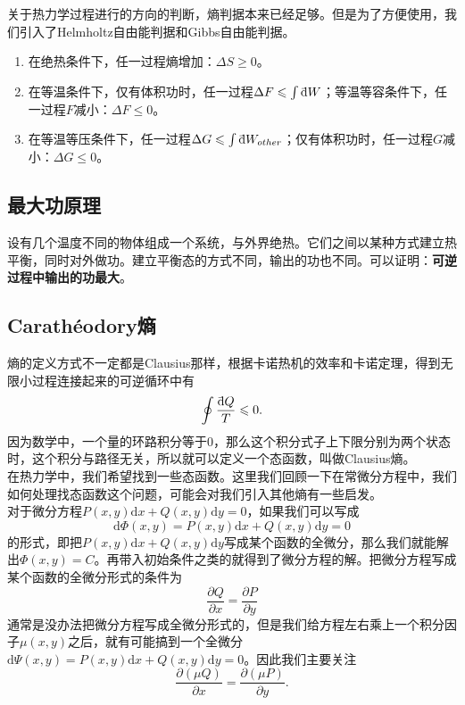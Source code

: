 \documentclass[UTF8]{ctexart}
\newcommand{\dbar}{\mathrm{\mathchar'26\mkern-9mu d}}
\newcommand{\md}{\mathrm{d}}
\numberwithin{equation}{subsection}
\begin{document}
关于热力学过程进行的方向的判断，熵判据本来已经足够。但是为了方便使用，我们引入了Helmholtz自由能判据和Gibbs自由能判据。
\begin{enumerate}
\item 在绝热条件下，任一过程熵增加：$\Delta S\geqslant0$。
\item 在等温条件下，仅有体积功时，任一过程$\Delta F\leqslant \int \dbar W$；等温等容条件下，任一过程$F$减小：$\Delta F\leqslant0$。
\item 在等温等压条件下，任一过程$\Delta G\leqslant \int \dbar W_{other}$；仅有体积功时，任一过程$G$减小：$\Delta G\leqslant0$。
\end{enumerate}
\subsection{最大功原理}
设有几个温度不同的物体组成一个系统，与外界绝热。它们之间以某种方式建立热平衡，同时对外做功。建立平衡态的方式不同，输出的功也不同。可以证明：\textbf{可逆过程中输出的功最大}。

\subsection{Carath\'{e}odory熵}

熵的定义方式不一定都是Clausius那样，根据卡诺热机的效率和卡诺定理，得到无限小过程连接起来的可逆循环中有
\begin{equation}\label{clausius}
\oint \frac{\dbar Q}{T}\leqslant 0.
\end{equation}
因为数学中，一个量的环路积分等于0，那么这个积分式子上下限分别为两个状态时，这个积分与路径无关，所以就可以定义一个态函数，叫做Clausius熵。\\

在热力学中，我们希望找到一些态函数。这里我们回顾一下在常微分方程中，我们如何处理找态函数这个问题，可能会对我们引入其他熵有一些启发。\\

对于微分方程$P(x,y)\md x+Q(x,y)\md y=0$，如果我们可以写成
\[ \md \Phi(x,y)=P(x,y)\md x+Q(x,y)\md y=0 \]
的形式，即把$P(x,y)\md x+Q(x,y)\md y$写成某个函数的全微分，那么我们就能解出$\Phi(x,y)=C$。再带入初始条件之类的就得到了微分方程的解。把微分方程写成某个函数的全微分形式的条件为
\[ \frac{\partial Q}{\partial x}=\frac{\partial P}{\partial y} \]
通常是没办法把微分方程写成全微分形式的，但是我们给方程左右乘上一个积分因子$\mu(x,y)$之后，就有可能搞到一个全微分$\md \Psi(x,y)=P(x,y)\md x+Q(x,y)\md y=0$。因此我们主要关注
\[ \frac{\partial (\mu Q)}{\partial x}=\frac{\partial (\mu P)}{\partial y}. \]
\end{document}
